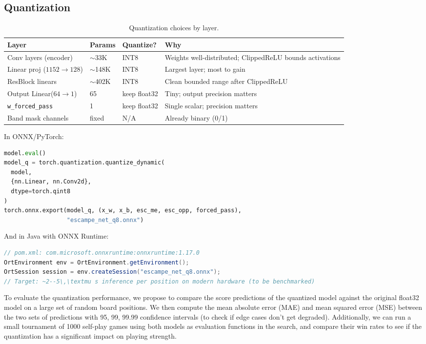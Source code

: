 \documentclass[11pt,a4paper]{article}
\begin{document}
\subsection{Quantization}
\begin{table}[htbp]
  \centering
  \caption{Quantization choices by layer.}
  \label{tab:quantization-choices}
  \begin{tabular}{L{0.30\textwidth} L{0.12\textwidth} L{0.16\textwidth} L{0.30\textwidth}}
    \toprule
    Layer & Params & Quantize? & Why \\
    \midrule
    Conv layers (encoder) & $\sim$33K & INT8 & Weights well-distributed; ClippedReLU bounds activations \\
    Linear proj ($1152\to128$) & $\sim$148K & INT8 & Largest layer; most to gain \\
    ResBlock linears & $\sim$402K & INT8 & Clean bounded range after ClippedReLU \\
    Output Linear($64\to1$) & 65 & keep float32 & Tiny; output precision matters \\
    \texttt{w\_forced\_pass} & 1 & keep float32 & Single scalar; precision matters \\
    Band mask channels & fixed & N/A & Already binary (0/1) \\
    \bottomrule
  \end{tabular}
\end{table}

In ONNX/PyTorch:
\begin{lstlisting}[language=Python]
model.eval()
model_q = torch.quantization.quantize_dynamic(
  model,
  {nn.Linear, nn.Conv2d},
  dtype=torch.qint8
)
torch.onnx.export(model_q, (x_w, x_b, esc_me, esc_opp, forced_pass),
                  "escampe_net_q8.onnx")
\end{lstlisting}

And in Java with ONNX Runtime:
\begin{lstlisting}[language=Java]
// pom.xml: com.microsoft.onnxruntime:onnxruntime:1.17.0
OrtEnvironment env = OrtEnvironment.getEnvironment();
OrtSession session = env.createSession("escampe_net_q8.onnx");
// Target: ~2--5\,\textmu s inference per position on modern hardware (to be benchmarked)
\end{lstlisting}

To evaluate the quantization performance, we propose to compare the score predictions of the quantized model against the original float32 model on a large set of random board positions. We then compute the mean absolute error (MAE) and mean squared error (MSE) between the two sets of predictions with 95, 99, 99.99 confidence intervals (to check if edge cases don't get degraded). Additionally, we can run a small tournament of 1000 self-play games using both models as evaluation functions in the search, and compare their win rates to see if the quantization has a significant impact on playing strength.
\end{document}
